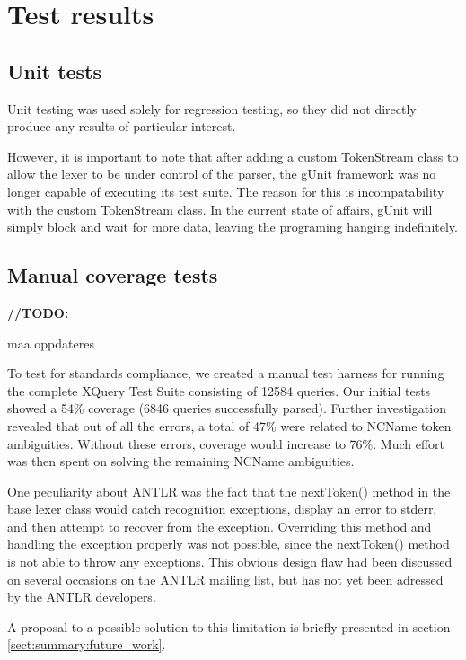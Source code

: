 \section{Test results}
\subsection{Unit tests}
Unit testing was used solely for regression testing, so they did not directly 
produce any results of particular interest.

However, it is important to note that after adding a custom TokenStream class to
allow the lexer to be under control of the parser, the gUnit framework was no
longer capable of executing its test suite. The reason for this is
incompatability with the custom TokenStream class. In the current state of
affairs, gUnit will simply block and wait for more data, leaving the programing
hanging indefinitely. 

\subsection{Manual coverage tests}
\label{sect:tests:manual}
\textbf{\LARGE //TODO:} 

maa oppdateres

To test for standards compliance, we created a manual test harness for running
the complete XQuery Test Suite\cite{w3c05} consisting of 12584 queries. Our
initial tests showed a 54\% coverage (6846 queries successfully parsed). Further
investigation revealed that out of all the errors, a total of 47\% were related
to NCName token ambiguities. Without these errors, coverage would increase to
76\%. Much effort was then spent on solving the remaining NCName ambiguities.

One peculiarity about ANTLR was the fact that the nextToken() method in the base
lexer class would catch recognition exceptions, display an error to stderr, and
then attempt to recover from the exception. Overriding this method and handling
the exception properly was not possible, since the nextToken() method is not
able to throw any exceptions. This obvious design flaw had been discussed on
several occasions on the ANTLR mailing list\cite{antlrmail}, but has not yet
been adressed by the ANTLR developers.

A proposal to a possible solution to this limitation is briefly presented in
section \ref{sect:summary:future_work}.